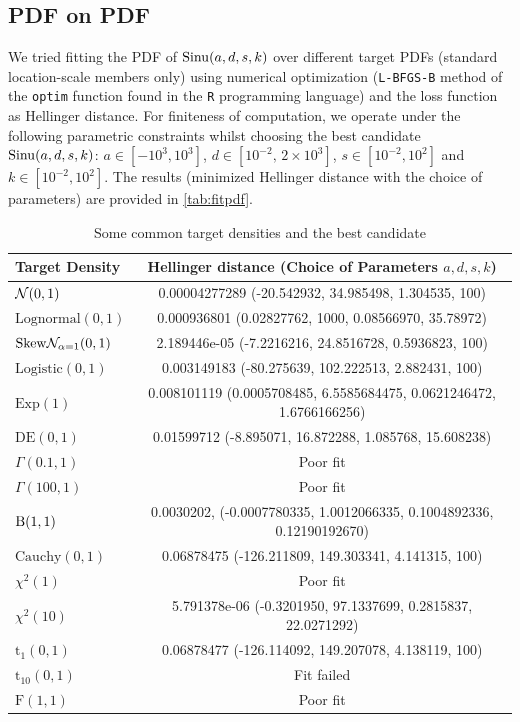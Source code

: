 \subsection{PDF on PDF}
We tried fitting the PDF of $\operatorname*{Sinu}(a,d,s,k)$ over different target PDFs (standard location-scale members only) using numerical optimization (\texttt{L-BFGS-B} method of the \texttt{optim} function found in the \texttt{R} programming language) and the loss function as Hellinger distance. For finiteness of computation, we operate under the following parametric constraints whilst choosing the best candidate $\operatorname*{Sinu}(a,d,s,k)$: $a \in [-10^3, 10^3]$, $d \in [10^{-2}, \, 2\times10^3]$, $s \in [10^{-2}, 10^2]$ and $k \in [10^{-2}, 10^2]$.
The results (minimized Hellinger distance with the choice of parameters) are provided in \autoref{tab:fitpdf}.
\begin{table}[h!]
    \centering
    \begin{tabularx}{\textwidth}{X|c}
        \toprule
        Target Density & Hellinger distance (Choice of Parameters $a,d,s,k$)\\
        \midrule
        $\mathcal{N}(0,1)$ & 0.00004277289 (-20.542932, 34.985498, 1.304535, 100)\\
        $\mathrm{Lognormal}(0,1)$ & 0.000936801 (0.02827762, 1000, 0.08566970, 35.78972) \\
        $\mathrm{Skew}\mathcal{N}_{\alpha=1} (0,1)$ & 2.189446e-05 (-7.2216216, 24.8516728, 0.5936823, 100) \\
        \hline
        $\mathrm{Logistic}(0,1)$ & 0.003149183 (-80.275639, 102.222513, 2.882431, 100) \\
        $\mathrm{Exp}(1)$ & 0.008101119 (0.0005708485, 6.5585684475, 0.0621246472, 1.6766166256) \\
        $\mathrm{DE}(0,1)$ & 0.01599712 (-8.895071, 16.872288, 1.085768, 15.608238) \\
        \hline
        $\Gamma(0.1,1)$ & Poor fit \\
        $\Gamma(100,1)$ & Poor fit \\
        $\mathrm B(1,1)$ & 0.0030202, (-0.0007780335, 1.0012066335, 0.1004892336, 0.12190192670) \\
        \hline
        $\mathrm{Cauchy}(0,1)$ & 0.06878475 (-126.211809, 149.303341, 4.141315, 100) \\
        \hline
        $\chi^2(1)$ & Poor fit \\
        $\chi^2(10)$ & 5.791378e-06 (-0.3201950, 97.1337699, 0.2815837, 22.0271292) \\
        $\mathrm{t}_1(0,1)$ & 0.06878477 (-126.114092, 149.207078, 4.138119, 100) \\
        $\mathrm{t}_{10}(0,1)$ & Fit failed \\
        $\mathrm{F}(1,1)$ & Poor fit \\
        \bottomrule
    \end{tabularx}
    \caption{Some common target densities and the best candidate \sindist{}}
    \label{tab:fitpdf}
\end{table}


